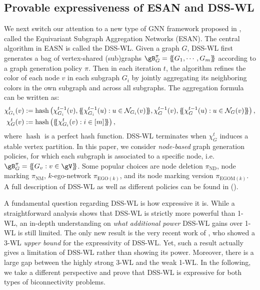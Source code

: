 \documentclass{article} %
\let\cref\crtcref
\newcommand*{\ldblbrace}{\{\mskip-5mu\{}
\newcommand*{\rdblbrace}{\}\mskip-5mu\}}
\begin{document}
\subsection{Provable expressiveness of ESAN and DSS-WL}
\label{sec:esan}
We next switch our attention to a new type of GNN framework proposed in \citet{bevilacqua2022equivariant}, called the Equivariant Subgraph Aggregation Networks (ESAN). The central algorithm in EASN is called the DSS-WL. Given a graph $G$, DSS-WL first generates a bag of vertex-shared (sub)graphs $\gB^\pi_G=\ldblbrace G_1,\cdots,G_m\rdblbrace$ according to a graph generation policy $\pi$. Then in each iteration $t$, the algorithm refines the color of each node $v$ in each subgraph $G_i$ by jointly aggregating its neighboring colors in the own subgraph and across all subgraphs. The aggregation formula can be written as:
\begin{align}
\label{eq:dsswl_aggregation}
    \chi_{G_i}^t(v)&:= \operatorname{hash}\left(\chi_{G_i}^{t-1}(v),\ldblbrace \chi_{G_i}^{t-1}(u):u\in \mathcal N_{G_i}(v) \rdblbrace,\chi_{G}^{t-1}(v),\ldblbrace \chi_{G}^{t-1}(u):u\in \mathcal N_G(v) \rdblbrace\right),\\
    \chi_G^t(v)&:= \operatorname{hash}\left(\ldblbrace \chi_{G_i}^{t}(v):i\in [m]\rdblbrace\right),
\end{align}
where $\operatorname{hash}$ is a perfect hash function. DSS-WL terminates when $\chi_G^t$ induces a stable vertex partition. In this paper, we consider \emph{node-based} graph generation policies, for which each subgraph is associated to a specific node, i.e. $\gB^\pi_G=\ldblbrace G_v:v\in\gV\rdblbrace$. Some popular choices are node deletion $\pi_\mathrm{ND}$, node marking $\pi_\mathrm{NM}$, $k$-ego-network $\pi_{\mathrm{EGO}(k)}$, and its node marking version $\pi_{\mathrm{EGOM}(k)}$. A full description of DSS-WL as well as different policies can be found in \cref{sec:dsswl} (\cref{alg:dsswl}).

A fundamental question regarding DSS-WL is how expressive it is. While a straightforward analysis shows that DSS-WL is strictly more powerful than 1-WL, an in-depth understanding on \emph{what additional power} DSS-WL gains over 1-WL is still limited. The only new result is the very recent work of \citet{frasca2022Understanding}, who showed a 3-WL \emph{upper bound} for the expressivity of DSS-WL. Yet, such a result actually gives a limitation of DSS-WL rather than showing its power. Moreover, there is a large gap between the highly strong 3-WL and the weak 1-WL. In the following, we take a different perspective and prove that DSS-WL is expressive for both types of biconnectivity problems.
\end{document}
